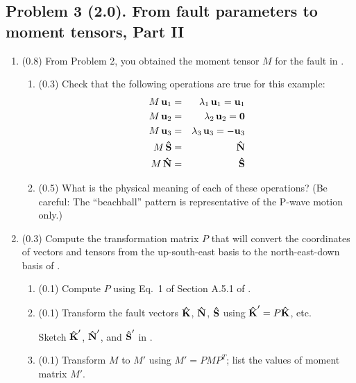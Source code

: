 \documentclass[11pt,titlepage,fleqn]{article}
\newcommand{\Mmat}{M}
\newcommand{\Pmat}{P}
\begin{document}
\subsection*{Problem 3 (2.0). From fault parameters to moment tensors, Part II}

\begin{enumerate}

\item (0.8) From Problem 2, you obtained the moment tensor $\Mmat$ for the fault in .

\begin{enumerate}
\item (0.3) Check that the following operations are true for this example:
%
\begin{eqnarray}
\Mmat \, \bu_1 &=& \lambda_1 \, \bu_1 = \bu_1
\\
\Mmat \, \bu_2 &=& \lambda_2 \, \bu_2 = \bzero
\\
\Mmat \, \bu_3 &=& \lambda_3 \, \bu_3 = -\bu_3
\\
\Mmat \, \bSh &=& \bNh
\\
\Mmat \, \bNh &=& \bSh
\end{eqnarray}

\item (0.5) What is the physical meaning of each of these operations? (Be careful: The ``beachball'' pattern is representative of the P-wave motion only.)

\end{enumerate}


\item (0.3) Compute the transformation matrix $\Pmat$ that will convert the coordinates of vectors and tensors from the up-south-east basis to the north-east-down basis of \citet{AkiRichardsE2}.
%
\begin{enumerate}
\item (0.1) Compute $\Pmat$ using Eq.~1 of Section A.5.1 of \cite{SteinWysession}.

\item (0.1) Transform the fault vectors $\mbox{\boldmath{$\hat{\rm K}$}}$, $\mbox{\boldmath{$\hat{\rm N}$}}$, $\mbox{\boldmath{$\hat{\rm S}$}}$ using $\bKh' = \Pmat\bKh$, etc.

Sketch $\mbox{\boldmath{$\hat{\rm K}$}}'$, $\mbox{\boldmath{$\hat{\rm N}$}}'$, and $\mbox{\boldmath{$\hat{\rm S}$}}'$ in .

\item (0.1) Transform $\Mmat$ to $\Mmat'$ using $\Mmat' = \Pmat \Mmat \Pmat^T$; list the values of moment matrix $M'$.
\end{enumerate}


\end{enumerate}
\end{document}
